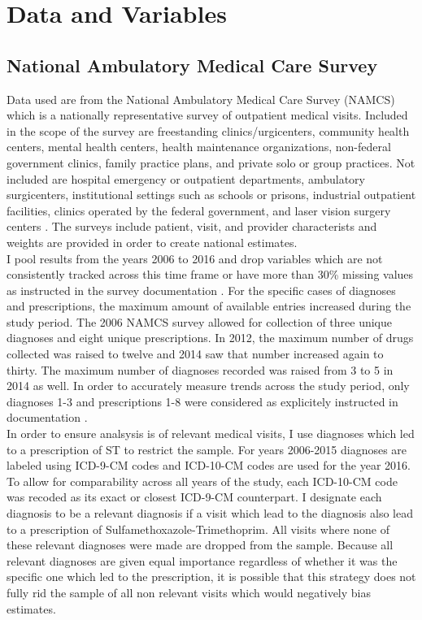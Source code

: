 \chapter{Data and Variables}

\section{National Ambulatory Medical Care Survey}
Data used are from the National Ambulatory Medical Care Survey (NAMCS) which is a nationally representative survey of outpatient medical visits. Included in the scope of the survey are freestanding clinics/urgicenters, community health centers, mental health centers, health maintenance organizations,  non-federal government clinics, family practice plans, and private solo or group practices. Not included are hospital emergency or outpatient departments, ambulatory surgicenters, institutional settings such as schools or prisons, industrial outpatient facilities, clinics operated by the federal government, and laser vision surgery centers \cite{hing_basic_nodate}. The surveys include patient, visit, and provider characterists and weights are provided in order to create national estimates.\\
\indent I pool results from the years 2006 to 2016 and drop variables which are not consistently tracked across this time frame or have more than 30\% missing values as instructed in the survey documentation \cite{myrick_understanding_nodate}. For the specific cases of diagnoses and prescriptions, the maximum amount of available entries increased during the study period. The 2006 NAMCS survey allowed for collection of three unique diagnoses and eight unique prescriptions. In 2012, the maximum number of drugs collected was raised to twelve and 2014 saw that number increased again to thirty. The maximum number of diagnoses recorded was raised from 3 to 5 in 2014 as well. In order to accurately measure trends across the study period, only diagnoses 1-3 and prescriptions 1-8 were considered as explicitely instructed in documentation \cite{schappert_analyzing_nodate}.\\
\indent In order to ensure analsysis is of relevant medical visits, I use diagnoses which led to a prescription of ST to restrict the sample. For years 2006-2015 diagnoses are labeled using ICD-9-CM codes and ICD-10-CM codes are used for the year 2016. To allow for comparability across all years of the study, each ICD-10-CM code was recoded as its exact or closest ICD-9-CM counterpart. I designate each diagnosis to be a relevant diagnosis if a visit which lead to the diagnosis also lead to a prescription of Sulfamethoxazole-Trimethoprim. All visits where none of these relevant diagnoses were made are dropped from the sample. Because all relevant diagnoses are given equal importance regardless of whether it was the specific one which led to the prescription, it is possible that this strategy does not fully rid the sample of all non relevant visits which would negatively bias estimates.\\
